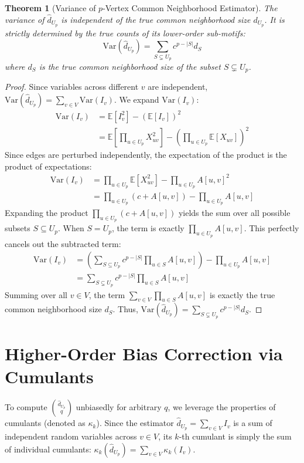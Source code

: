 \documentclass[11pt,a4paper]{article}
\newtheorem{theorem}{Theorem}
\begin{document}
\begin{theorem}[Variance of $p$-Vertex Common Neighborhood Estimator]
The variance of $\hat{d}_{U_p}$ is independent of the true common neighborhood size $d_{U_p}$. It is strictly determined by the true counts of its lower-order sub-motifs:
\begin{equation}
    \text{Var}(\hat{d}_{U_p}) = \sum_{S \subsetneq U_p} c^{p - |S|} d_S
\end{equation}
where $d_S$ is the true common neighborhood size of the subset $S \subsetneq U_p$.
\end{theorem}
\begin{proof}
Since variables across different $v$ are independent, $\text{Var}(\hat{d}_{U_p}) = \sum_{v \in V} \text{Var}(I_v)$. We expand $\text{Var}(I_v)$:
\begin{align*}
    \text{Var}(I_v) &= \mathbb{E}[I_v^2] - (\mathbb{E}[I_v])^2 \\
    &= \mathbb{E}\left[\prod_{u \in U_p} X_{uv}^2\right] - \left(\prod_{u \in U_p} \mathbb{E}[X_{uv}]\right)^2
\end{align*}
Since edges are perturbed independently, the expectation of the product is the product of expectations:
\begin{align*}
    \text{Var}(I_v) &= \prod_{u \in U_p} \mathbb{E}[X_{uv}^2] - \prod_{u \in U_p} A[u,v]^2 \\
    &= \prod_{u \in U_p} (c + A[u,v]) - \prod_{u \in U_p} A[u,v]
\end{align*}
Expanding the product $\prod_{u \in U_p} (c + A[u,v])$ yields the sum over all possible subsets $S \subseteq U_p$. When $S = U_p$, the term is exactly $\prod_{u \in U_p} A[u,v]$. This perfectly cancels out the subtracted term:
\begin{align*}
    \text{Var}(I_v) &= \left( \sum_{S \subseteq U_p} c^{p - |S|} \prod_{u \in S} A[u,v] \right) - \prod_{u \in U_p} A[u,v] \\
    &= \sum_{S \subsetneq U_p} c^{p - |S|} \prod_{u \in S} A[u,v]
\end{align*}
Summing over all $v \in V$, the term $\sum_{v \in V} \prod_{u \in S} A[u,v]$ is exactly the true common neighborhood size $d_S$. Thus, $\text{Var}(\hat{d}_{U_p}) = \sum_{S \subsetneq U_p} c^{p - |S|} d_S$.
\end{proof}
\section{Higher-Order Bias Correction via Cumulants}
To compute $\binom{\hat{d}_{U_p}}{q}$ unbiasedly for arbitrary $q$, we leverage the properties of cumulants (denoted as $\kappa_k$). Since the estimator $\hat{d}_{U_p} = \sum_{v \in V} I_v$ is a sum of independent random variables across $v \in V$, its $k$-th cumulant is simply the sum of individual cumulants: $\kappa_k(\hat{d}_{U_p}) = \sum_{v \in V} \kappa_k(I_v)$.
\end{document}
